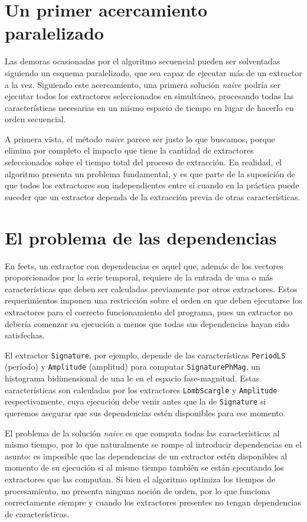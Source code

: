 \section{Un primer acercamiento paralelizado}

Las demoras ocasionadas por el algoritmo secuencial pueden ser solventadas siguiendo un esquema paralelizado, que sea capaz de ejecutar más de un extractor a la vez. Siguiendo este acercamiento, una primera solución \emph{naive} podría ser ejecutar todos los extractores seleccionados en simultáneo, procesando todas las características necesarias en un mismo espacio de tiempo en lugar de hacerlo en orden secuencial.

A primera vista, el método \emph{naive} parece ser justo lo que buscamos, porque elimina por completo el impacto que tiene la cantidad de extractores seleccionados sobre el tiempo total del proceso de extracción. En realidad, el algoritmo presenta un problema fundamental, y es que parte de la suposición de que todos los extractores son independientes entre sí cuando en la práctica puede suceder que un extractor dependa de la extracción previa de otras características.

\section{El problema de las dependencias}

En \gls{feets}, un extractor con dependencias es aquel que, además de los vectores proporcionados por la serie temporal, requiere de la entrada de una o más características que deben ser calculadas previamente por otros extractores. Estos requerimientos imponen una restricción sobre el orden en que deben ejecutarse los extractores para el correcto funcionamiento del programa, pues un extractor no debería comenzar su ejecución a menos que todas sus dependencias hayan sido satisfechas.

El extractor \texttt{Sig\-na\-ture}, por ejemplo, depende de las características \texttt{Pe\-riod\-LS} (período) y \texttt{Am\-pli\-tude} (amplitud) para computar \texttt{SignaturePhMag}, un histograma bidimensional de una \acrfull{lc} en el espacio fase-magnitud. Estas características son calculadas por los extractores \texttt{LombScargle} y \texttt{Amplitude} respectivamente, cuya ejecución debe venir antes que la de \texttt{Signature} si queremos asegurar que sus dependencias estén disponibles para ese momento.

El problema de la solución \emph{naive} es que computa todas las características al mismo tiempo, por lo que naturalmente se rompe al introducir dependencias en el asunto: es imposible que las dependencias de un extractor estén disponibles al momento de su ejecución si al mismo tiempo también se están ejecutando los extractores que las computan. Si bien el algoritmo optimiza los tiempos de procesamiento, no presenta ninguna noción de orden, por lo que funciona correctamente siempre y cuando los extractores presentes no tengan dependencias de características.

